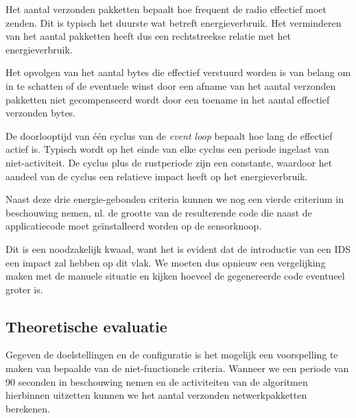 \begin{description}[noitemsep, topsep=0pt, partopsep=0pt]
  
  \item[Aantal verzonden netwerkpakketten] Het aantal verzonden pakketten
  bepaalt hoe frequent de radio effectief moet zenden. Dit is typisch het
  duurste wat betreft energieverbruik. Het verminderen van het aantal pakketten
  heeft dus een rechtstreekse relatie met het energieverbruik.

  \item[Aantal verzonden bytes] Het opvolgen van het aantal bytes die effectief
  verstuurd worden is van belang om in te schatten of de eventuele winst door
  een afname van het aantal verzonden pakketten niet gecompenseerd wordt door
  een toename in het aantal effectief verzonden bytes.

  \item[Lengte event loop] De doorlooptijd van \'e\'en cyclus van de
  \emph{event loop} bepaalt hoe lang de \mcu effectief actief is. Typisch wordt
  op het einde van elke cyclus een periode ingelast van niet-activiteit. De
  cyclus plus de rustperiode zijn een constante, waardoor het aandeel van de
  cyclus een relatieve impact heeft op het energieverbruik.
  
\end{description}

Naast deze drie energie-gebonden criteria kunnen we nog een vierde criterium in
beschouwing nemen, nl. de grootte van de resulterende code die naast de
applicatiecode moet ge\"installeerd worden op de sensorknoop.

Dit is een noodzakelijk kwaad, want het is evident dat de introductie van een
IDS een impact zal hebben op dit vlak. We moeten dus opnieuw een vergelijking
maken met de manuele situatie en kijken hoeveel de gegenereerde code eventueel
groter is.

\vspace{-3mm}

\subsection{Theoretische evaluatie}

Gegeven de doelstellingen en de configuratie is het mogelijk een voorspelling
te maken van bepaalde van de niet-functionele criteria. Wanneer we een periode
van 90 seconden in beschouwing nemen en de activiteiten van de algoritmen
hierbinnen uitzetten kunnen we het aantal verzonden netwerkpakketten berekenen.

